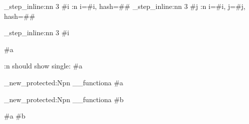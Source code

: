 \documentclass{article}
\begin{document}
\ExplSyntaxOn


\begin{imperativerun}

%

	\int_step_inline:nn {3} \scope #i {
		\pretty:n {i=#i, hash=##}
		\int_step_inline:nn {3} \scope #j {
			\pretty:n {i=#i, j=#j, hash=##}
		}
	}

	\int_step_inline:nn {3} \scope #i {
	}



	\def\f\scopevar #a{
	}

	\pretty:n {should show single: #a}

	\cs_new_protected:Npn \__functiona \scopevar #a {
		\cs_new_protected:Npn \__functiona \scopevar #b {

			#a #b  %




}}
\end{imperativerun}
\end{document}
